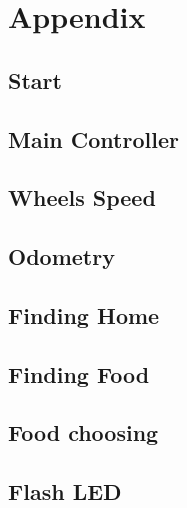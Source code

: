 \documentclass[]{article}
\begin{document}
\section{Appendix}

\subsection{Start}

\subsection{Main Controller}

\subsection{Wheels Speed}

\subsection{Odometry}

\subsection{Finding Home}

\subsection{Finding Food}

\subsection{Food choosing}

\subsection{Flash LED}

\end{document}
